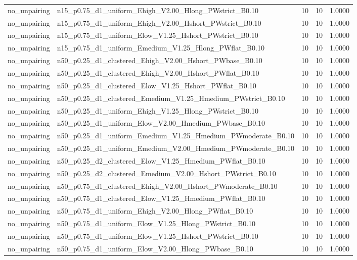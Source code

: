 \begin{tabular}{llrrr}
no_unpairing & n15_p0.75_d1_uniform_Ehigh_V2.00_Hlong_PWstrict_B0.10 & 10 & 10 & 1.0000 \\
no_unpairing & n15_p0.75_d1_uniform_Ehigh_V2.00_Hshort_PWstrict_B0.10 & 10 & 10 & 1.0000 \\
no_unpairing & n15_p0.75_d1_uniform_Elow_V1.25_Hshort_PWstrict_B0.10 & 10 & 10 & 1.0000 \\
no_unpairing & n15_p0.75_d1_uniform_Emedium_V1.25_Hlong_PWflat_B0.10 & 10 & 10 & 1.0000 \\
no_unpairing & n50_p0.25_d1_clustered_Ehigh_V2.00_Hshort_PWbase_B0.10 & 10 & 10 & 1.0000 \\
no_unpairing & n50_p0.25_d1_clustered_Ehigh_V2.00_Hshort_PWflat_B0.10 & 10 & 10 & 1.0000 \\
no_unpairing & n50_p0.25_d1_clustered_Elow_V1.25_Hshort_PWflat_B0.10 & 10 & 10 & 1.0000 \\
no_unpairing & n50_p0.25_d1_clustered_Emedium_V1.25_Hmedium_PWstrict_B0.10 & 10 & 10 & 1.0000 \\
no_unpairing & n50_p0.25_d1_uniform_Ehigh_V1.25_Hlong_PWstrict_B0.10 & 10 & 10 & 1.0000 \\
no_unpairing & n50_p0.25_d1_uniform_Elow_V2.00_Hmedium_PWbase_B0.10 & 10 & 10 & 1.0000 \\
no_unpairing & n50_p0.25_d1_uniform_Emedium_V1.25_Hmedium_PWmoderate_B0.10 & 10 & 10 & 1.0000 \\
no_unpairing & n50_p0.25_d1_uniform_Emedium_V2.00_Hmedium_PWmoderate_B0.10 & 10 & 10 & 1.0000 \\
no_unpairing & n50_p0.25_d2_clustered_Elow_V1.25_Hmedium_PWflat_B0.10 & 10 & 10 & 1.0000 \\
no_unpairing & n50_p0.25_d2_clustered_Emedium_V2.00_Hshort_PWstrict_B0.10 & 10 & 10 & 1.0000 \\
no_unpairing & n50_p0.75_d1_clustered_Ehigh_V2.00_Hshort_PWmoderate_B0.10 & 10 & 10 & 1.0000 \\
no_unpairing & n50_p0.75_d1_clustered_Elow_V1.25_Hmedium_PWflat_B0.10 & 10 & 10 & 1.0000 \\
no_unpairing & n50_p0.75_d1_uniform_Ehigh_V2.00_Hlong_PWflat_B0.10 & 10 & 10 & 1.0000 \\
no_unpairing & n50_p0.75_d1_uniform_Elow_V1.25_Hlong_PWstrict_B0.10 & 10 & 10 & 1.0000 \\
no_unpairing & n50_p0.75_d1_uniform_Elow_V1.25_Hshort_PWstrict_B0.10 & 10 & 10 & 1.0000 \\
no_unpairing & n50_p0.75_d1_uniform_Elow_V2.00_Hlong_PWbase_B0.10 & 10 & 10 & 1.0000 \\

\end{tabular}
